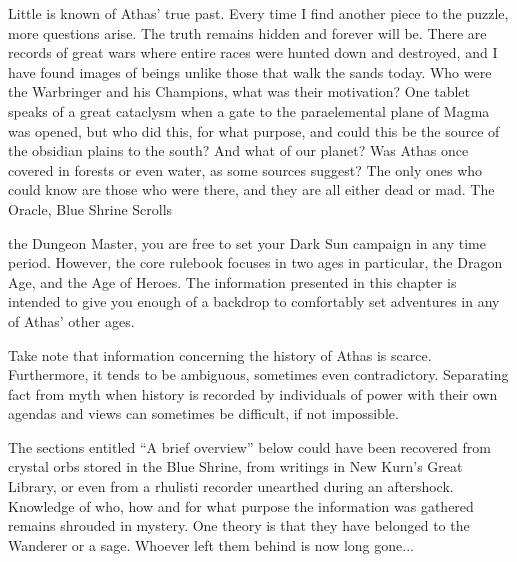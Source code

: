 {Little is known of Athas' true past. Every time I find another piece to the puzzle, more questions arise. The truth remains hidden and forever will be. There are records of great wars where entire races were hunted down and destroyed, and I have found images of beings unlike those that walk the sands today. Who were the Warbringer and his Champions, what was their motivation? One tablet speaks of a great cataclysm when a gate to the paraelemental plane of Magma was opened, but who did this, for what purpose, and could this be the source of the obsidian plains to the south? And what of our planet? Was Athas once covered in forests or even water, as some sources suggest? The only ones who could know are those who were there, and they are all either dead or mad.}
{The Oracle, Blue Shrine Scrolls}

 the Dungeon Master, you are free to set your {\tableheader Dark Sun} campaign in any time period. However, the core rulebook focuses in two ages in particular, the Dragon Age, and the Age of Heroes. The information presented in this chapter is intended to give you enough of a backdrop to comfortably set adventures in any of Athas' other ages.

Take note that information concerning the history of Athas is scarce. Furthermore, it tends to be ambiguous, sometimes even contradictory. Separating fact from myth when history is recorded by individuals of power with their own agendas and views can sometimes be difficult, if not impossible.

The sections entitled ``A brief overview'' below could have been recovered from crystal orbs stored in the Blue Shrine, from writings in New Kurn's Great Library, or even from a rhulisti recorder unearthed during an aftershock. Knowledge of who, how and for what purpose the information was gathered remains shrouded in mystery. One theory is that they have belonged to the Wanderer or a sage. Whoever left them behind is now long gone...





